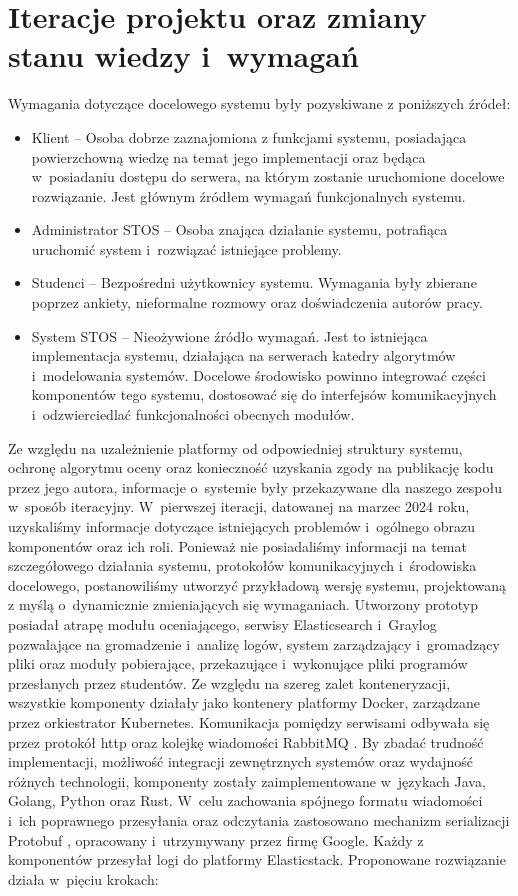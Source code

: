 \section{Iteracje projektu oraz zmiany stanu wiedzy i~wymagań}
Wymagania dotyczące docelowego systemu były pozyskiwane z poniższych źródeł:
\begin{itemize}
    \item Klient -- Osoba dobrze zaznajomiona z funkcjami systemu, posiadająca powierzchowną wiedzę na temat jego implementacji oraz będąca w~posiadaniu dostępu do serwera, na którym zostanie uruchomione docelowe rozwiązanie. Jest głównym źródłem wymagań funkcjonalnych systemu.
    \item Administrator STOS -- Osoba znająca działanie systemu, potrafiąca uruchomić system i~rozwiązać istniejące problemy.
    \item Studenci -- Bezpośredni użytkownicy systemu. Wymagania były zbierane poprzez ankiety, nieformalne rozmowy oraz doświadczenia autorów pracy.
    \item System STOS -- Nieożywione źródło wymagań. Jest to istniejąca implementacja systemu, działająca na serwerach katedry algorytmów i~modelowania systemów. Docelowe środowisko powinno  integrować części komponentów tego systemu, dostosować się do interfejsów komunikacyjnych i~odzwierciedlać funkcjonalności obecnych modułów.
\end{itemize}
Ze względu na uzależnienie platformy od odpowiedniej struktury systemu, ochronę algorytmu oceny oraz konieczność uzyskania zgody na publikację kodu przez jego autora, informacje o~systemie były przekazywane dla naszego zespołu w~sposób iteracyjny.
\newline \indent W~pierwszej iteracji, datowanej na marzec 2024 roku, uzyskaliśmy informacje dotyczące istniejących problemów i~ogólnego obrazu komponentów oraz ich roli. Ponieważ nie posiadaliśmy informacji na temat szczegółowego działania systemu, protokołów komunikacyjnych i~środowiska docelowego, postanowiliśmy utworzyć przykładową wersję systemu, projektowaną z myślą o~dynamicznie zmieniających się wymaganiach. Utworzony prototyp posiadał atrapę modułu oceniającego, serwisy Elasticsearch i~Graylog pozwalające na gromadzenie i~analizę logów, system zarządzający i~gromadzący pliki oraz moduły pobierające, przekazujące i~wykonujące pliki programów przesłanych przez studentów. Ze względu na szereg zalet konteneryzacji, wszystkie komponenty działały jako kontenery platformy Docker, zarządzane przez orkiestrator Kubernetes. Komunikacja pomiędzy serwisami odbywała się przez protokół http oraz kolejkę wiadomości RabbitMQ \cite{rabbit}. By zbadać trudność implementacji, możliwość integracji zewnętrznych systemów oraz wydajność różnych technologii, komponenty zostały zaimplementowane w~językach Java, Golang, Python oraz Rust. W~celu zachowania spójnego formatu wiadomości i~ich poprawnego przesyłania oraz odczytania zastosowano mechanizm serializacji Protobuf \cite{protobuf}, opracowany i~utrzymywany przez firmę Google. Każdy z komponentów przesyłał logi do platformy Elasticstack. Proponowane rozwiązanie działa w~pięciu krokach:
